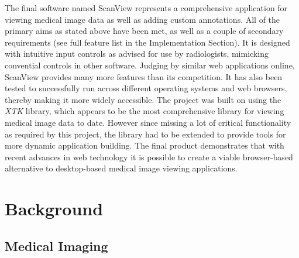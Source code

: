 \documentclass[a4paper,11pt,twoside]{article}
\begin{document}
The final software named ScanView represents a comprehensive application for viewing medical image data as well as adding custom annotations. All of the primary aims as stated above have been met, as well as a couple of secondary requirements (see full feature list in the Implementation Section). It is designed with intuitive input controls as advised for use by radiologists, mimicking convential controls in other software. Judging by similar web applications online, ScanView provides many more features than its competition. It has also been tested to successfully run across different operating systems and web browsers, thereby making it more widely accessible. The project was built on using the \textit{XTK} library, which appears to be the most comprehensive library for viewing medical image data to date. However since missing a lot of critical functionality as required by this project, the library had to be extended to provide tools for more dynamic application building. The final product demonstrates that with recent advances in web technology it is possible to create a viable browser-based alternative to desktop-based medical image viewing applications.

\newpage
\section{Background}



\subsection{Medical Imaging}
\end{document}
